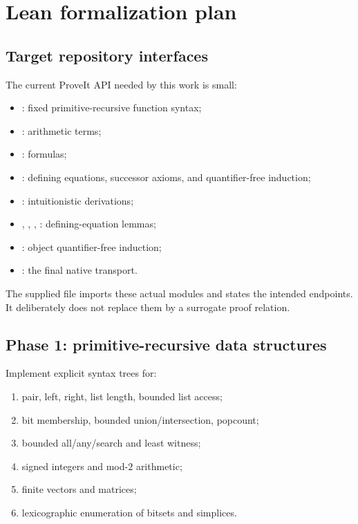 
\section{Lean formalization plan}
\label{sec:lean}

\subsection{Target repository interfaces}

The current ProveIt API needed by this work is small:
\begin{itemize}
  \item {}: fixed primitive-recursive function syntax;
  \item {}: arithmetic terms;
  \item {}: formulas;
  \item {}: defining equations, successor axioms, and quantifier-free induction;
  \item {}: intuitionistic derivations;
  \item {}, , , : defining-equation lemmas;
  \item {}: object quantifier-free induction;
  \item {}: the final native transport.
\end{itemize}

The supplied file  imports these actual modules and states the intended endpoints.  It deliberately does not replace them by a surrogate proof relation.

\subsection{Phase 1: primitive-recursive data structures}

Implement explicit  syntax trees for:
\begin{enumerate}
  \item pair, left, right, list length, bounded list access;
  \item bit membership, bounded union/intersection, popcount;
  \item bounded all/any/search and least witness;
  \item signed integers and mod-$2$ arithmetic;
  \item finite vectors and matrices;
  \item lexicographic enumeration of bitsets and simplices.
\end{enumerate}

